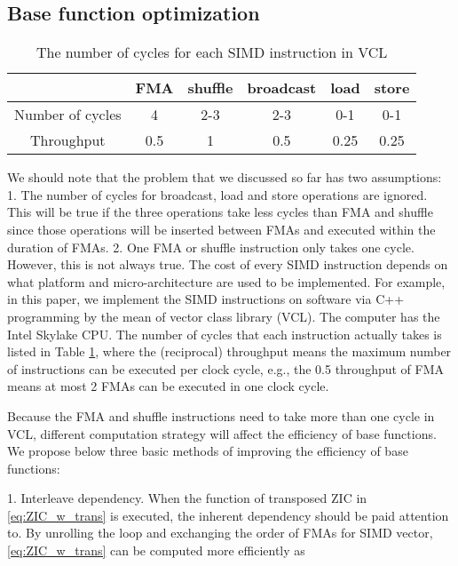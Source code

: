 \subsection{Base function optimization}

\begin{table}[t]
    \caption{The number of cycles for each SIMD instruction in VCL}  %
    \centering %
    \begin{tabular}{c c c c c c} %
    \hline\hline %
     & FMA & shuffle & broadcast & load & store \\ [1ex] %
    \hline %
    Number of cycles & 4 & 2-3 & 2-3 & 0-1 & 0-1 \\ [0.3ex]
    Throughput & 0.5 & 1 & 0.5 & 0.25 & 0.25 \\ [1ex]
    \hline
    \end{tabular}
    \label{table:number_of_cycles} %
\end{table}

We should note that the problem that we discussed so far has two assumptions: 1. The number of cycles for broadcast,
load and store operations are ignored. This will be true if the three operations take less cycles than FMA and shuffle since
those operations will be inserted between FMAs and executed within the duration of FMAs. 
2. One FMA or shuffle instruction only takes one cycle. However, this is not always true.
The cost of every SIMD instruction depends on what platform and micro-architecture are used to be implemented. For example, 
in this paper, we implement the SIMD instructions on software via C++ programming by the mean of vector class library (VCL).
The computer has the Intel Skylake CPU. The number of cycles that each instruction actually takes is listed in Table \ref{table:number_of_cycles},
where the (reciprocal) throughput means the maximum number of instructions can be executed per clock cycle, e.g., the 0.5 throughput of FMA means
at most 2 FMAs can be executed in one clock cycle.

Because the FMA and shuffle instructions need to take more than one cycle in VCL, different computation strategy will affect the efficiency of base functions.
We propose below three basic methods of improving the efficiency of base functions:

1. Interleave dependency. When the function of transposed ZIC in \eqref{eq:ZIC_w_trans} is executed, the inherent dependency should be paid attention to.
By unrolling the loop and exchanging the order of FMAs for SIMD vector, \eqref{eq:ZIC_w_trans} can be computed more efficiently as

